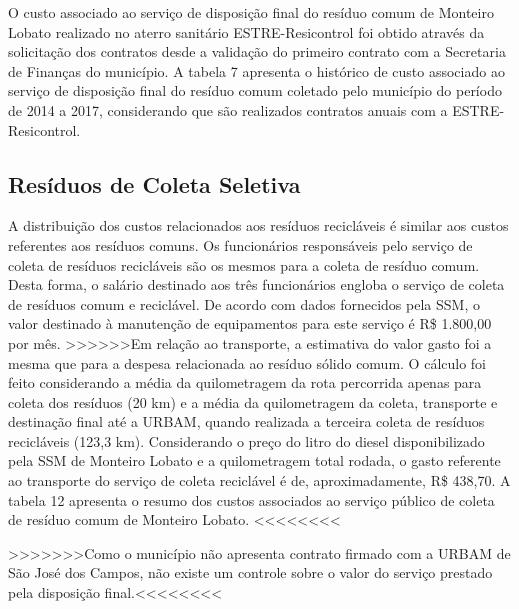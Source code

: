 	
	
	O custo associado ao serviço de disposição final do resíduo comum de Monteiro Lobato realizado no aterro sanitário ESTRE-Resicontrol foi obtido através da solicitação dos contratos desde a validação do primeiro contrato com a Secretaria de Finanças do município. A tabela 7 apresenta o histórico de custo associado ao serviço de disposição final do resíduo comum coletado pelo município do período de 2014 a 2017, considerando que são realizados contratos anuais com a ESTRE-Resicontrol.
	
	
	
	\subsection{Resíduos de Coleta Seletiva}
	A distribuição dos custos relacionados aos resíduos recicláveis é similar aos custos referentes aos resíduos comuns. Os funcionários responsáveis pelo serviço de coleta de resíduos recicláveis são os mesmos para a coleta de resíduo comum. Desta forma, o salário destinado aos três funcionários engloba o serviço de coleta de resíduos comum e reciclável.
	De acordo com dados fornecidos pela SSM, o valor destinado à manutenção de equipamentos para este serviço é R\$ 1.800,00 por mês. 
	>>>>>>Em relação ao transporte, a estimativa do valor gasto foi a mesma que para a despesa relacionada ao resíduo sólido comum. O cálculo foi feito considerando a média da quilometragem da rota percorrida apenas para coleta dos resíduos (20 km) e a média da quilometragem da coleta, transporte e destinação final até a URBAM, quando realizada a terceira coleta de resíduos recicláveis (123,3 km).
	Considerando o preço do litro do diesel disponibilizado pela SSM de Monteiro Lobato e a quilometragem total rodada, o gasto referente ao transporte do serviço de coleta reciclável é de, aproximadamente, R\$ 438,70. A tabela 12 apresenta o resumo dos custos associados ao serviço público de coleta de resíduo comum de Monteiro Lobato.
	<<<<<<<<
	
	
	
	>>>>>>>Como o município não apresenta contrato firmado com a URBAM de São José dos Campos, não existe um controle sobre o valor do serviço prestado pela disposição final.<<<<<<<<
	
	
